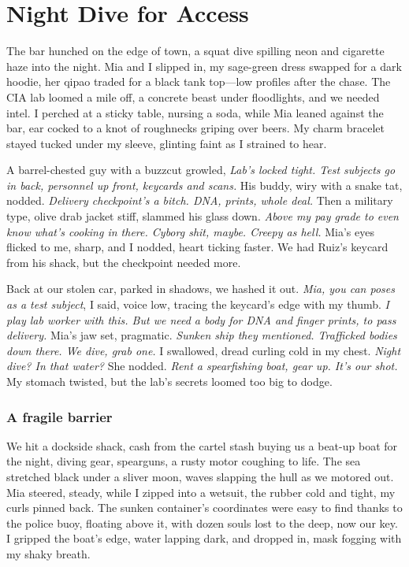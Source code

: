 \documentclass[12pt,oneside]{book}
\begin{document}
\chapter{Night Dive for Access}

The bar hunched on the edge of town, a squat dive spilling neon and cigarette haze into the night. Mia and I slipped in, my sage-green dress swapped for a dark hoodie, her qipao traded for a black tank top—low profiles after the chase. The CIA lab loomed a mile off, a concrete beast under floodlights, and we needed intel. I perched at a sticky table, nursing a soda, while Mia leaned against the bar, ear cocked to a knot of roughnecks griping over beers. My charm bracelet stayed tucked under my sleeve, glinting faint as I strained to hear.

A barrel-chested guy with a buzzcut growled, \textit{Lab’s locked tight. Test subjects go in back, personnel up front, keycards and scans.} His buddy, wiry with a snake tat, nodded. \textit{Delivery checkpoint’s a bitch. DNA, prints, whole deal.} Then a military type, olive drab jacket stiff, slammed his glass down. \textit{Above my pay grade to even know what’s cooking in there. Cyborg shit, maybe. Creepy as hell.} Mia’s eyes flicked to me, sharp, and I nodded, heart ticking faster. We had Ruiz’s keycard from his shack, but the checkpoint needed more.

Back at our stolen car, parked in shadows, we hashed it out. \textit{Mia, you can poses as a test subject}, I said, voice low, tracing the keycard’s edge with my thumb. \textit{I play lab worker with this. But we need a body for DNA and finger prints, to pass delivery.} Mia’s jaw set, pragmatic. \textit{Sunken ship they mentioned. Trafficked bodies down there. We dive, grab one.} I swallowed, dread curling cold in my chest. \textit{Night dive? In that water?} She nodded. \textit{Rent a spearfishing boat, gear up. It’s our shot.} My stomach twisted, but the lab’s secrets loomed too big to dodge.

\subsection*{A fragile barrier}

We hit a dockside shack, cash from the cartel stash buying us a beat-up boat for the night, diving gear, spearguns, a rusty motor coughing to life. The sea stretched black under a sliver moon, waves slapping the hull as we motored out. Mia steered, steady, while I zipped into a wetsuit, the rubber cold and tight, my curls pinned back. The sunken container's coordinates were easy to find thanks to the police buoy, floating above it, with dozen souls lost to the deep, now our key. I gripped the boat’s edge, water lapping dark, and dropped in, mask fogging with my shaky breath.
\end{document}
